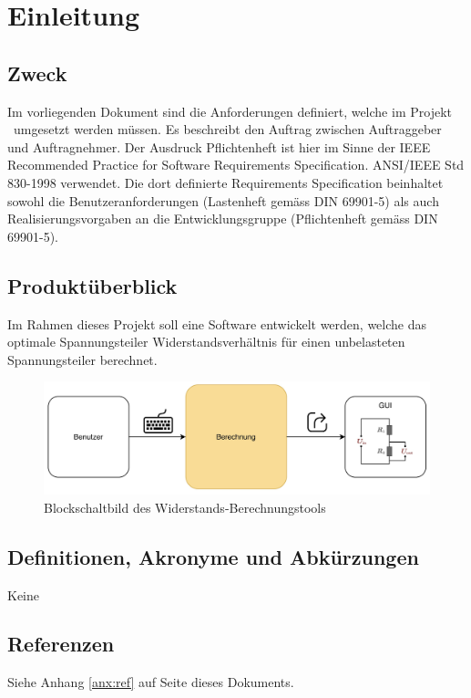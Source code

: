 \section{Einleitung}
\label{sec:intro}

\subsection{Zweck}
Im vorliegenden Dokument sind die Anforderungen definiert, welche im Projekt \subjectinfo\ umgesetzt werden müssen. 
Es beschreibt den Auftrag zwischen Auftraggeber und Auftragnehmer. 
Der Ausdruck Pflichtenheft ist hier im Sinne der IEEE Recommended Practice for Software Requirements Specification. ANSI/IEEE Std 830-1998 verwendet.
Die dort definierte Requirements Specification beinhaltet sowohl die Benutzeranforderungen (Lastenheft gemäss DIN 69901-5) als auch Realisierungsvorgaben an die Entwicklungsgruppe (Pflichtenheft gemäss DIN 69901-5).

\subsection{Produktüberblick}
Im Rahmen dieses Projekt soll eine Software entwickelt werden, welche das optimale Spannungsteiler Widerstandsverhältnis für einen unbelasteten Spannungsteiler berechnet.
\begin{figure}[!h]
	\centering
	\includegraphics[width=12cm]{./images/Block.png}
	\caption{Blockschaltbild des Widerstands-Berechnungstools}
	\label{fig:blockdiagram}
\end{figure}

\subsection{Definitionen, Akronyme und Abkürzungen}
Keine

\subsection{Referenzen}
Siehe Anhang \ref{anx:ref} auf Seite \pageref{anx:ref} dieses Dokuments.